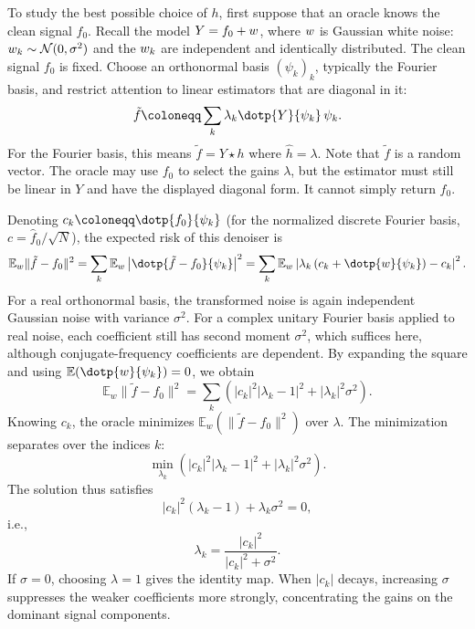 To study the best possible choice of $h$, first suppose that an oracle knows the clean signal $f_0$.
%
Recall the model $Y = f_0 + w$, where $w$ is Gaussian white noise: $w_k \sim \mathcal{N}(0, \sigma^2)$ and the $w_k$ are independent and identically distributed. The clean signal $f_0$ is fixed. Choose an orthonormal basis $(\psi_k)_k$, typically the Fourier basis, and restrict attention to linear estimators that are diagonal in it:
\begin{equation}\label{eq:linear-denoiser}
	\tilde{f} \coloneqq \sum_k \lambda_k \dotp{Y}{\psi_k} \, \psi_k.
\end{equation}
For the Fourier basis, this means $\tilde{f} = Y \star h$ where $\hat h=\lambda$. Note that $\tilde{f}$ is a random vector.
%
The oracle may use $f_0$ to select the gains $\lambda$, but the estimator must still be linear in $Y$ and have the displayed diagonal form. It cannot simply return $f_0$.

Denoting $c_k \coloneqq \dotp{f_0}{\psi_k}$ (for the normalized discrete Fourier basis, $c=\hat f_0/\sqrt N$), the expected risk of this denoiser is
$$
	\mathbb{E}_w \|\tilde{f} - f_0\|^2 = \sum_k \mathbb{E}_w \left| \dotp{\tilde{f} - f_0}{\psi_k} \right|^2  = \sum_k \mathbb{E}_w  \left| \lambda_k \left( c_k + \dotp{\noise}{\psi_k} \right) - c_k \right|^2 .
$$
For a real orthonormal basis, the transformed noise is again independent Gaussian noise with variance $\sigma^2$. For a complex unitary Fourier basis applied to real noise, each coefficient still has second moment $\sigma^2$, which suffices here, although conjugate-frequency coefficients are dependent. By expanding the square and using $\mathbb{E}(\dotp{\noise}{\psi_k}) = 0$, we obtain
$$
\mathbb{E}_w  \|\tilde{f} - f_0\|^2  = \sum_k\left(|c_k|^2|\lambda_k-1|^2+|\lambda_k|^2\sigma^2\right) .
$$
Knowing $c_k$, the oracle minimizes $\mathbb{E}_w \left( \|\tilde{f} - f_0\|^2 \right)$ over $\lambda$. The minimization separates over the indices $k$:
$$
	\min_{\lambda_k} \left( |c_k|^2 |\lambda_k - 1|^2 + |\lambda_k|^2 \sigma^2 \right).
$$
The solution thus satisfies
$$
	|c_k|^2 (\lambda_k - 1) + \lambda_k \sigma^2 = 0,
$$
i.e.,
$$
	\lambda_k = \frac{|c_k|^2}{|c_k|^2+\sigma^2}.
$$
If $\sigma = 0$, choosing $\lambda = 1$ gives the identity map. When $|c_k|$ decays, increasing $\sigma$ suppresses the weaker coefficients more strongly, concentrating the gains on the dominant signal components.



